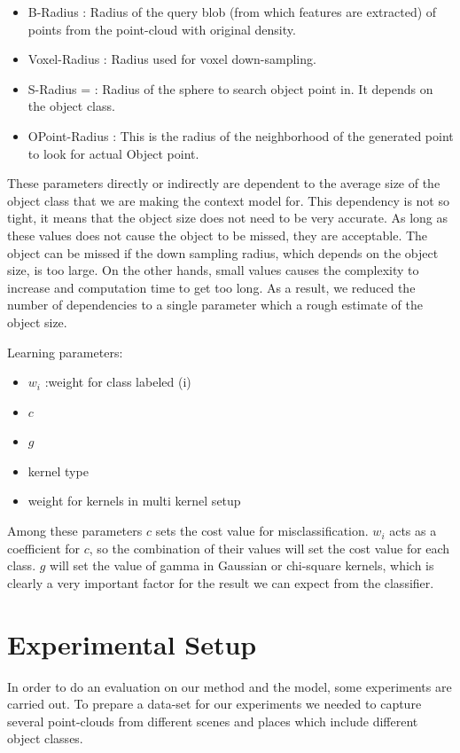 \begin{itemize}
 \item  B-Radius : Radius of the query blob (from which features are extracted) of points from the point-cloud with original
 density.
 \item Voxel-Radius : Radius used for voxel down-sampling. 
 \item S-Radius = : Radius of the sphere to search object point in. 
 It depends on the object class.
 \item OPoint-Radius : This is the radius of the neighborhood of the generated point to look for actual Object point.
\end{itemize}

These parameters directly or indirectly are dependent to the average size of the object class that we are making the context model
for. 
This dependency is not so tight, it means that the object size does not need to be very accurate. 
As long as these values does not cause the object to be missed, they are acceptable.
The object can be missed if the down sampling radius, which depends on the object size, is too large. 
On the other hands, small values causes the complexity to increase and computation time to get too long.  
As a result, we reduced the number of dependencies to a single parameter which a rough estimate of the object size.


Learning parameters:
\begin{itemize}
 \item $w_i$ :weight for class labeled (i)
 \item $c$
 \item $g$
 \item kernel type
 \item weight for kernels in multi kernel setup
\end{itemize}

Among these parameters $c$ sets the cost value for misclassification. 
$w_i$ acts as a coefficient for $c$, so the combination of their values will set the cost value for each class. 
$g$ will set the value of gamma in Gaussian or chi-square kernels, which is clearly a very important factor for the result we can 
expect from the classifier. 




\section{Experimental Setup}
\label{ExperimentalSetup.sec}
In order to do an evaluation on our method and the model, some experiments are carried out.
To prepare a data-set for our experiments we needed to capture several point-clouds from different scenes and places which 
include different object classes.


